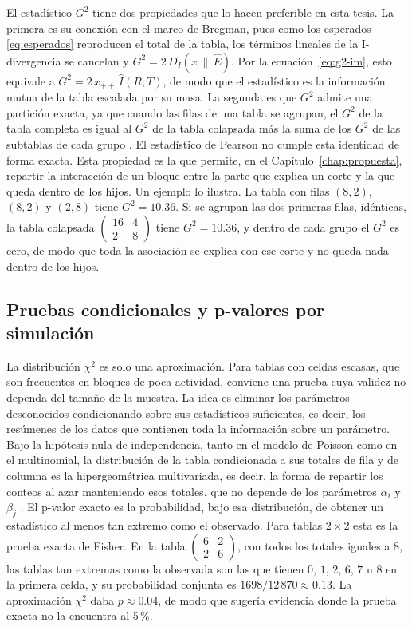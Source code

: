 El estadístico $G^2$ tiene dos propiedades que lo hacen preferible en esta tesis.
La primera es su conexión con el marco de Bregman, pues como los esperados
\eqref{eq:esperados} reproducen el total de la tabla, los términos lineales de la
I-divergencia se cancelan y $G^2 = 2\,D_I(x \,\|\, \hat{E})$. Por la
ecuación~\eqref{eq:g2-im}, esto equivale a $G^2 = 2\,x_{++}\,\hat{I}(R;T)$, de modo
que el estadístico es la información mutua de la tabla escalada por su masa. La
segunda es que $G^2$ admite una partición exacta, ya que cuando las filas de una tabla se
agrupan, el $G^2$ de la tabla completa es igual al $G^2$ de la tabla colapsada más
la suma de los $G^2$ de las subtablas de cada grupo \cite{Agresti2013}. El
estadístico de Pearson no cumple esta identidad de forma exacta. Esta propiedad
es la que permite, en el Capítulo~\ref{chap:propuesta}, repartir la interacción
de un bloque entre la parte que explica un corte y la que queda dentro de los
hijos. Un ejemplo lo ilustra. La tabla con filas $(8,2)$, $(8,2)$ y $(2,8)$ tiene
$G^2 = 10.36$. Si se agrupan las dos primeras filas, idénticas, la tabla colapsada
$\begin{pmatrix} 16 & 4 \\ 2 & 8 \end{pmatrix}$ tiene $G^2 = 10.36$, y dentro de
cada grupo el $G^2$ es cero, de modo que toda la asociación se explica con ese
corte y no queda nada dentro de los hijos.

\subsection{Pruebas condicionales y p-valores por simulación}\label{sec:est-permutacion}

La distribución $\chi^2$ es solo una aproximación. Para tablas con celdas
escasas, que son frecuentes en bloques de poca actividad, conviene una prueba cuya
validez no dependa del tamaño de la muestra. La idea es eliminar los parámetros
desconocidos condicionando sobre sus estadísticos suficientes, es decir, los resúmenes de los datos que contienen toda la información sobre un parámetro. Bajo la hipótesis
nula de independencia, tanto en el modelo de Poisson como en el multinomial, la
distribución de la tabla condicionada a sus totales de fila y de columna es la
hipergeométrica multivariada, es decir, la forma de repartir los conteos al azar
manteniendo esos totales, que no depende de los parámetros $\alpha_i$ y
$\beta_j$ \cite{Agresti2013}. El p-valor exacto es la probabilidad, bajo esa
distribución, de obtener un estadístico al menos tan extremo como el observado.
Para tablas $2 \times 2$ esta es la prueba exacta de Fisher. En la tabla
$\begin{pmatrix} 6 & 2 \\ 2 & 6 \end{pmatrix}$, con todos los totales iguales a
$8$, las tablas tan extremas como la observada son las que tienen $0$, $1$, $2$,
$6$, $7$ u $8$ en la primera celda, y su probabilidad conjunta es
$1698/12\,870 \approx 0.13$. La aproximación $\chi^2$ daba $p \approx 0.04$, de
modo que sugería evidencia donde la prueba exacta no la encuentra al 5\,\%.

